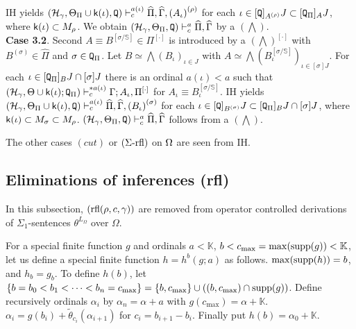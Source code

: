 \documentclass{article}
\begin{document}
IH yields 
$(\mathcal{H}_{\gamma},\Theta_{\Pi}\cup{\sf k}(\iota),{\tt Q}
)
\vdash^{a(\iota)}_{c}
\widehat{\Pi},\widehat{\Gamma},
\left(A_{\iota}\right)^{(\rho)}$
for each $\iota\in [{\tt Q}]_{A^{(\rho)}}J\subset [{\tt Q}_{\Pi}]_{A}J$, where ${\sf k}(\iota)\subset M_{\rho}$.
We obtain
$(\mathcal{H}_{\gamma},\Theta_{\Pi},{\tt Q})\vdash^{a}_{c}
\widehat{\Pi},\widehat{\Gamma}$ by a $(\bigwedge)$.
\\
\textbf{Case 3.2}.
Second 
$A\equiv B^{[\sigma/\mathbb{S}]}\in\Pi^{[\cdot]}$ is introduced by a $(\bigwedge)^{[\cdot]}$
with $B^{(\sigma)}\in\widehat{\Pi}$ and $\sigma\in {\tt Q}_{\Pi}$.
Let $B\simeq\bigwedge\left(B_{\iota}\right)_{\iota\in J}$
with $A\simeq\bigwedge\left(B_{\iota}^{[\sigma/\mathbb{S}]}\right)_{\iota\in [\sigma]J}$.
For each $\iota\in [{\tt Q}_{\Pi}]_{B}J\cap [\sigma]J$
there is an ordinal
 $a(\iota)<a$ 
such that
$(\mathcal{H}_{\gamma},\Theta\cup{\sf k}(\iota);{\tt Q}_{\Pi}
)
\vdash^{* a(\iota)}_{c}
\Gamma; A_{\iota},\Pi^{[\cdot]}$ for $A_{\iota}\equiv B_{\iota}^{[\sigma/\mathbb{S}]}$.
IH yields $(\mathcal{H}_{\gamma},\Theta_{\Pi}\cup{\sf k}(\iota),{\tt Q}
)
\vdash^{a(\iota)}_{c}
\widehat{\Pi},\widehat{\Gamma},\left(B_{\iota}\right)^{(\sigma)}$
for each $\iota\in[{\tt Q}]_{B^{(\sigma)}}J\subset [{\tt Q}_{\Pi}]_{B}J\cap [\sigma]J$, where
${\sf k}(\iota)\subset M_{\sigma}\subset M_{\rho}$.
$(\mathcal{H}_{\gamma},\Theta_{\Pi},{\tt Q})
\vdash^{a}_{c}
\widehat{\Pi},\widehat{\Gamma}$ 
follows from a $(\bigwedge)$.




The other cases
$(cut)$ or $(\Sigma\mbox{{\rm -rfl}})$ on $\Omega$ are seen from IH.
\eprf








\subsection{Eliminations of inferences (rfl)}\label{subsec:elimrfl}

In this subsection, $({\rm rfl}(\rho,c,\gamma))$ 
are removed from operator controlled derivations of $\Sigma_{1}$-sentences 
$\theta^{L_{\Omega}}$ over $\Omega$.




\bdf\label{df:hstepdownpi11}
{\rm
For a special finite function $g$ and
ordinals $a<\mathbb{K}$, $b< c_{\max}=\max({\rm supp}(g))<\mathbb{K}$, 
let us define a special finite function $h=h^{b}(g;a)$ as follows.
$\max({\rm supp}(h))=b$, and
$h_{b}=g_{b}$.
To define $h(b)$,
let $\{b=b_{0}<b_{1}<\cdots<b_{n}=c_{\max}\}=\{b,c_{\max}\}\cup\left((b,c_{\max})\cap {\rm supp}(g)\right)$.
Define recursively ordinals $\alpha_{i}$ by
$\alpha_{n}=\alpha+a$ with $g(c_{\max})=\alpha+\mathbb{K}$.
$\alpha_{i}=g(b_{i})+\tilde{\theta}_{c_{i}}(\alpha_{i+1})$ for
$c_{i}=b_{i+1}-b_{i}$.
Finally put $h(b)=\alpha_{0}+\mathbb{K}$.

}
\edf
\end{document}
